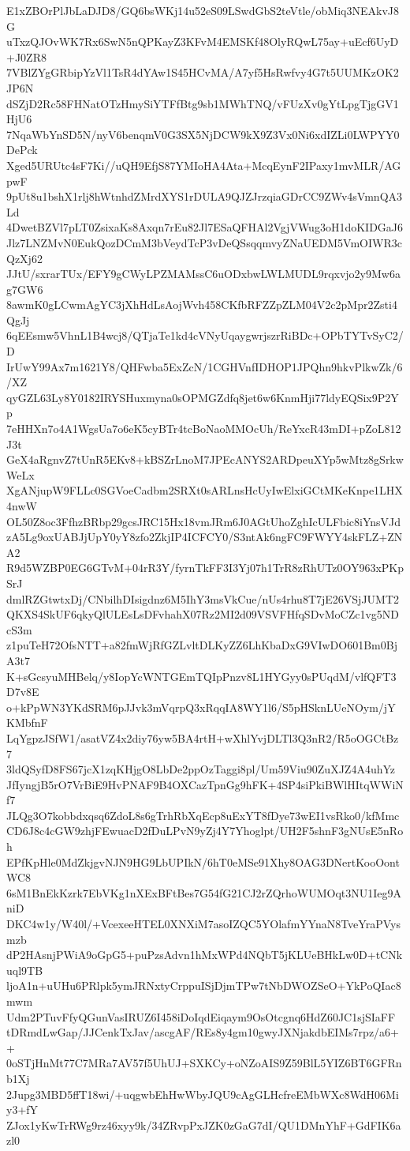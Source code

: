 E1xZBOrPlJbLaDJD8/GQ6bsWKj14u52eS09LSwdGbS2teVtle/obMiq3NEAkvJ8G
uTxzQJOvWK7Rx6SwN5nQPKayZ3KFvM4EMSKf48OlyRQwL75ay+uEcf6UyD+J0ZR8
7VBlZYgGRbipYzVl1TsR4dYAw1S45HCvMA/A7yf5HsRwfvy4G7t5UUMKzOK2JP6N
dSZjD2Rc58FHNatOTzHmySiYTFfBtg9sb1MWhTNQ/vFUzXv0gYtLpgTjgGV1HjU6
7NqaWbYnSD5N/nyV6benqmV0G3SX5NjDCW9kX9Z3Vx0Ni6xdIZLi0LWPYY0DePck
Xged5URUtc4sF7Ki//uQH9EfjS87YMIoHA4Ata+McqEynF2IPaxy1mvMLR/AGpwF
9pUt8u1bshX1rlj8hWtnhdZMrdXYS1rDULA9QJZJrzqiaGDrCC9ZWv4sVmnQA3Ld
4DwetBZVl7pLT0ZsixaKs8Axqn7rEu82Jl7ESaQFHAl2VgjVWug3oH1doKIDGaJ6
Jlz7LNZMvN0EukQozDCmM3bVeydTcP3vDeQSsqqmvyZNaUEDM5VmOIWR3cQzXj62
JJtU/sxrarTUx/EFY9gCWyLPZMAMssC6uODxbwLWLMUDL9rqxvjo2y9Mw6ag7GW6
8awmK0gLCwmAgYC3jXhHdLsAojWvh458CKfbRFZZpZLM04V2c2pMpr2Zsti4QgJj
6qEEsmw5VhnL1B4wcj8/QTjaTe1kd4cVNyUqaygwrjszrRiBDc+OPbTYTvSyC2/D
IrUwY99Ax7m1621Y8/QHFwba5ExZcN/1CGHVnfIDHOP1JPQhn9hkvPlkwZk/6/XZ
qyGZL63Ly8Y0182IRYSHuxmyna0sOPMGZdfq8jet6w6KnmHji77ldyEQSix9P2Yp
7eHHXn7o4A1WgsUa7o6eK5cyBTr4tcBoNaoMMOcUh/ReYxcR43mDI+pZoL812J3t
GeX4aRgnvZ7tUnR5EKv8+kBSZrLnoM7JPEcANYS2ARDpeuXYp5wMtz8gSrkwWeLx
XgANjupW9FLLc0SGVoeCadbm2SRXt0sARLnsHcUyIwElxiGCtMKeKnpe1LHX4nwW
OL50Z8oc3FfhzBRbp29gcsJRC15Hx18vmJRm6J0AGtUhoZghIcULFbic8iYnsVJd
zA5Lg9oxUABJjUpY0yY8zfo2ZkjIP4ICFCY0/S3ntAk6ngFC9FWYY4skFLZ+ZNA2
R9d5WZBP0EG6GTvM+04rR3Y/fyrnTkFF3I3Yj07h1TrR8zRhUTz0OY963xPKpSrJ
dmlRZGtwtxDj/CNbilhDIsigdnz6M5IhY3msVkCue/nUs4rhu8T7jE26VSjJUMT2
QKXS4SkUF6qkyQlULEsLsDFvhahX07Rz2MI2d09VSVFHfqSDvMoCZc1vg5NDcS3m
z1puTeH72OfsNTT+a82fmWjRfGZLvltDLKyZZ6LhKbaDxG9VIwDO601Bm0BjA3t7
K+sGcsyuMHBelq/y8IopYcWNTGEmTQIpPnzv8L1HYGyy0sPUqdM/vlfQFT3D7v8E
o+kPpWN3YKdSRM6pJJvk3mVqrpQ3xRqqIA8WY1l6/S5pHSknLUeNOym/jYKMbfnF
LqYgpzJSfW1/asatVZ4x2diy76yw5BA4rtH+wXhlYvjDLTl3Q3nR2/R5oOGCtBz7
3ldQSyfD8FS67jcX1zqKHjgO8LbDe2ppOzTaggi8pl/Um59Viu90ZuXJZ4A4uhYz
JfIyngjB5rO7VrBiE9HvPNAF9B4OXCazTpnGg9hFK+4SP4siPkiBWlHItqWWiNf7
JLQg3O7kobbdxqsq6ZdoL8s6gTrhRbXqEcp8uExYT8fDye73wEI1vsRko0/kfMmc
CD6J8c4cGW9zhjFEwuacD2fDuLPvN9yZj4Y7Yhoglpt/UH2F5shnF3gNUsE5nRoh
EPfKpHle0MdZkjgvNJN9HG9LbUPIkN/6hT0eMSe91Xhy8OAG3DNertKooOontWC8
6sM1BnEkKzrk7EbVKg1nXExBFtBes7G54fG21CJ2rZQrhoWUMOqt3NU1Ieg9AniD
DKC4w1y/W40l/+VcexeeHTEL0XNXiM7asoIZQC5YOlafmYYnaN8TveYraPVysmzb
dP2HAsnjPWiA9oGpG5+puPzsAdvn1hMxWPd4NQbT5jKLUeBHkLw0D+tCNkuql9TB
ljoA1n+uUHu6PRlpk5ymJRNxtyCrppuISjDjmTPw7tNbDWOZSeO+YkPoQIac8mwm
Udm2PTuvFfyQGunVasIRUZ6I458iDoIqdEiqaym9OsOtcgnq6HdZ60JC1sjSIaFF
tDRmdLwGap/JJCenkTxJav/ascgAF/REs8y4gm10gwyJXNjakdbEIMs7rpz/a6++
0oSTjHnMt77C7MRa7AV57f5UhUJ+SXKCy+oNZoAIS9Z59BlL5YIZ6BT6GFRnb1Xj
2Jupg3MBD5ffT18wi/+uqgwbEhHwWbyJQU9cAgGLHcfreEMbWXc8WdH06Miy3+fY
ZJox1yKwTrRWg9rz46xyy9k/34ZRvpPxJZK0zGaG7dI/QU1DMnYhF+GdFIK6azl0
